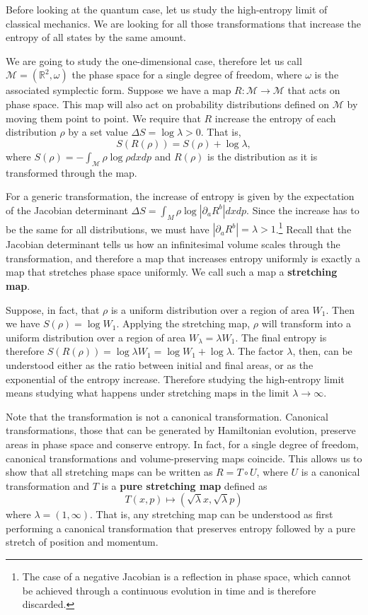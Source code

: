 \documentclass{article}
\begin{document}
Before looking at the quantum case, let us study the high-entropy limit of classical mechanics. We are looking for all those transformations that increase the entropy of all states by the same amount.

We are going to study the one-dimensional case, therefore let us call $\mathcal{M} = (\mathbb{R}^2, \omega)$ the phase space for a single degree of freedom, where $\omega$ is the associated symplectic form. Suppose we have a map $R : \mathcal{M} \to \mathcal{M}$ that acts on phase space. This map will also act on probability distributions defined on $\mathcal{M}$ by moving them point to point. We require that $R$ increase the entropy of each distribution $\rho$ by a set value $\Delta S = \log \lambda > 0$. That is,
\begin{equation}
S(R(\rho)) = S(\rho) + \log \lambda,
\end{equation}
where $S(\rho) = - \int_{\mathcal{M}} \rho \log \rho dx dp$ and $R(\rho)$ is the distribution as it is transformed through the map.

For a generic transformation, the increase of entropy is given by the expectation of the Jacobian determinant $\Delta S =\int_M \rho \log |\partial_a R^b| dxdp$. Since the increase has to be the same for all distributions, we must have $|\partial_a R^b| = \lambda > 1$.\footnote{The case of a negative Jacobian is a reflection in phase space, which cannot be achieved through a continuous evolution in time and is therefore discarded.} Recall that the Jacobian determinant tells us how an infinitesimal volume scales through the transformation, and therefore a map that increases entropy uniformly is exactly a map that stretches phase space uniformly. We call such a map a \textbf{stretching map}.

Suppose, in fact, that $\rho$ is a uniform distribution over a region of area $W_1$. Then we have $S(\rho)= \log W_1$. Applying the stretching map, $\rho$ will transform into a uniform distribution over a region of area $W_{\lambda} = \lambda W_1$. The final entropy is therefore $S(R(\rho)) = \log \lambda W_1 = \log W_1 + \log \lambda$. The factor $\lambda$, then, can be understood either as the ratio between initial and final areas, or as the exponential of the entropy increase. Therefore studying the high-entropy limit means studying what happens under stretching maps in the limit $\lambda \to \infty$.

Note that the transformation is not a canonical transformation. Canonical transformations, those that can be generated by Hamiltonian evolution, preserve areas in phase space and conserve entropy. In fact, for a single degree of freedom, canonical transformations and volume-preserving maps coincide. This allows us to show that all stretching maps can be written as $R = T \circ U$, where $U$ is a canonical transformation and $T$ is a \textbf{pure stretching map} defined as
\begin{equation}
    T(x,p) \mapsto (\sqrt{\lambda} x, \sqrt{\lambda} p)
\end{equation}
where $\lambda = (1,\infty)$. That is, any stretching map can be understood as first performing a canonical transformation that preserves entropy followed by a pure stretch of position and momentum.
\end{document}
